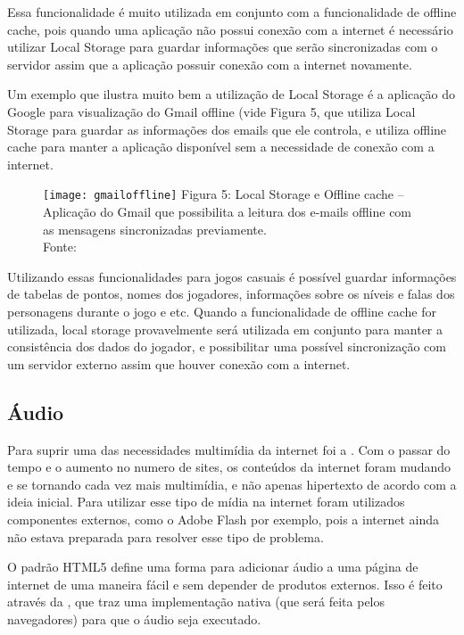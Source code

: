 Essa funcionalidade é muito utilizada em conjunto com a funcionalidade
de offline cache, pois quando uma aplicação não possui conexão com a
internet é necessário utilizar Local Storage para guardar informações
que serão sincronizadas com o servidor assim que a aplicação possuir
conexão com a internet novamente.

Um exemplo que ilustra muito bem a utilização de Local Storage é a
aplicação do Google para visualização do Gmail offline (vide
Figura 5, que utiliza Local Storage para guardar
as informações dos emails que ele controla, e utiliza offline cache
para manter a aplicação disponível sem a necessidade de conexão com a
internet.

\begin{figure}[H]
  \centering
	\texttt{[image: gmailoffline]}
	\footnotesize\hspace{8\baselineskip}
	Figura 5: Local Storage e Offline cache {--} Aplicação do Gmail que possibilita a leitura dos e-mails offline com as mensagens sincronizadas previamente. \\
	Fonte: 
  \label{img:gmailoffline}
\end{figure}

Utilizando essas funcionalidades para jogos casuais é possível
guardar informações de tabelas de pontos, nomes dos jogadores,
informações sobre os níveis e falas dos personagens durante o jogo e
etc. Quando a funcionalidade de offline cache for utilizada, local
storage provavelmente será utilizada em conjunto para manter a
consistência dos dados do jogador, e possibilitar uma possível
sincronização com um servidor externo assim que houver conexão com a
internet.

\subsection{Áudio}
Para suprir uma das necessidades multimídia
da internet foi a \tagaudio. Com o passar do tempo e o aumento no
numero de sites, os conteúdos da internet foram mudando
e se tornando cada vez mais multimídia, e não apenas hipertexto de
acordo com a ideia inicial. Para utilizar esse tipo de mídia na
internet foram utilizados componentes externos, como o Adobe Flash por
exemplo, pois a internet ainda não estava preparada para resolver esse
tipo de problema.

O padrão HTML5 define uma forma para adicionar áudio a uma página de
internet de uma maneira fácil e sem depender de produtos externos.
Isso é feito através da \tagaudio, que traz uma
implementação nativa (que será feita pelos navegadores) para que o
áudio seja executado.

